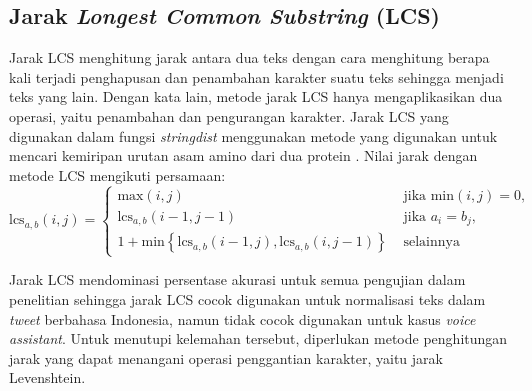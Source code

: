 \subsection{Jarak \textit{Longest Common Substring} (LCS)}

Jarak LCS menghitung jarak antara dua teks dengan cara menghitung berapa kali terjadi penghapusan dan penambahan karakter suatu teks sehingga menjadi teks yang lain. Dengan kata lain, metode jarak LCS hanya mengaplikasikan dua operasi, yaitu penambahan dan pengurangan karakter. Jarak LCS yang digunakan dalam fungsi \textit{stringdist} menggunakan metode yang digunakan untuk mencari kemiripan urutan asam amino dari dua protein \parencite{needleman1970general}. Nilai jarak dengan metode LCS mengikuti persamaan:
\begin{equation}
	\text{lcs}_{a,b}(i,j)=\begin{cases}
		\text{max}(i,j) & \text{ jika min} (i,j)=0, \\ 
		\text{lcs}_{a,b}(i-1,j-1) & \text{ jika } a_{i}=b_{j}, \\
		1 + \text{min}\left \{ \text{lcs}_{a,b}(i-1,j), \text{lcs}_{a,b}(i,j-1) \right \} & \text{ selainnya}
	\end{cases}
\end{equation}

Jarak LCS mendominasi persentase akurasi untuk semua pengujian dalam penelitian sehingga jarak LCS cocok digunakan untuk normalisasi teks dalam \textit{tweet} berbahasa Indonesia, namun tidak cocok digunakan untuk kasus \textit{voice assistant}. Untuk menutupi kelemahan tersebut, diperlukan metode penghitungan jarak yang dapat menangani operasi penggantian karakter, yaitu jarak Levenshtein.

